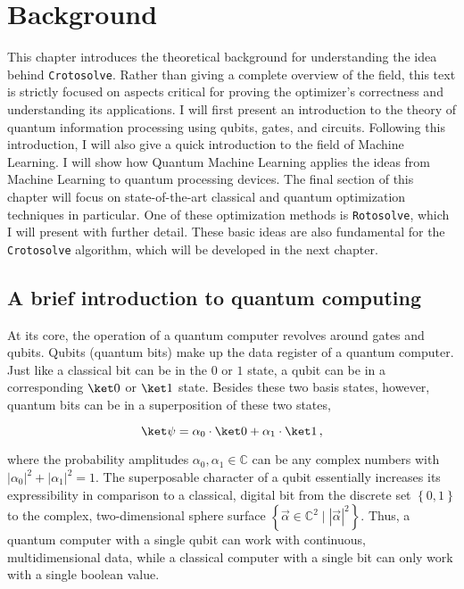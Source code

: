 \chapter{Background}
\label{chap:background}

This chapter introduces the theoretical background for understanding the idea
behind \texttt{Crotosolve}.
Rather than giving a complete overview of the field, this text is strictly
focused on aspects critical for proving the optimizer's correctness and
understanding its applications.
I will first present an introduction to the theory of quantum information
processing using qubits, gates, and circuits.
Following this introduction, I will also give a quick introduction to the field
of Machine Learning.
I will show how Quantum Machine Learning applies the ideas from Machine Learning
to quantum processing devices.
The final section of this chapter will focus on state-of-the-art classical and
quantum optimization techniques in particular.
One of these optimization methods is \texttt{Rotosolve}, which I will present
with further detail.
These basic ideas are also fundamental for the \texttt{Crotosolve} algorithm,
which will be developed in the next chapter.

\section{A brief introduction to quantum computing}
\label{sec:quantum-intro}
At its core, the operation of a quantum computer revolves around gates and
qubits.
Qubits (quantum bits) make up the data register of a quantum computer.
Just like a classical bit can be in the $0$ or $1$ state, a qubit can be in a
corresponding $\ket 0$ or $\ket 1$ state.
Besides these two basis states, however, quantum bits can be in a superposition
of these two states,

$$\ket \psi = \alpha_0 \cdot \ket 0 + \alpha_1 \cdot \ket 1\,,$$

where the probability amplitudes $\alpha_0, \alpha_1 \in \mathbb C$ can be any
complex numbers with $\left|\alpha_0\right|^2 + \left|\alpha_1\right|^2 = 1$.
The superposable character of a qubit essentially increases its expressibility
in comparison to a classical, digital bit from the discrete set
$\left\{0, 1\right\}$ to the complex, two-dimensional sphere surface
$\left\{\vec \alpha \in \mathbb C^2 \mid \left|\vec\alpha\right|^2\right\}$.
Thus, a quantum computer with a single qubit can work with continuous,
multidimensional data, while a classical computer with a single bit can only
work with a single boolean value.

